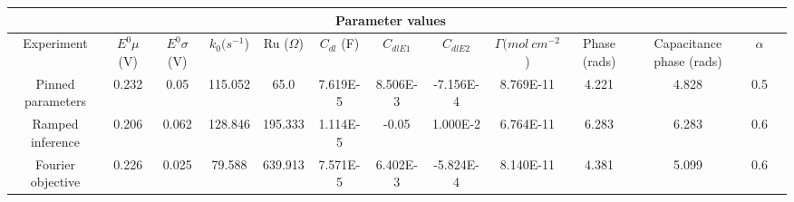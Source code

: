 \documentclass[preview]{standalone}
\begin{document}
\begin{center}
\begin{tabular}{|c|c|c|c|c|c|c|c|c|c|c|c|c|}
\hline
\multicolumn{12}{|c|}{Parameter values}\\ 
\hline
Experiment & $E^0 \mu$ (V) & $E^0 \sigma$ (V) & $k_0 (s^{-1}$) & Ru ($\Omega$) & $C_{dl}$ (F) & $C_{dlE1}$ & $C_{dlE2}$ & $\Gamma (mol\:cm^{-2}$) & Phase (rads) & Capacitance phase (rads) & $\alpha$\\
\hline
Pinned parameters & 0.232 & 0.05 & 115.052 & 65.0 & 7.619E-5 & 8.506E-3 & -7.156E-4 & 8.769E-11 & 4.221 & 4.828 & 0.5\\
\hline
Ramped inference & 0.206 & 0.062 & 128.846 & 195.333 & 1.114E-5 & -0.05 & 1.000E-2 & 6.764E-11 & 6.283 & 6.283 & 0.6\\
\hline
Fourier objective & 0.226 & 0.025 & 79.588 & 639.913 & 7.571E-5 & 6.402E-3 & -5.824E-4 & 8.140E-11 & 4.381 & 5.099 & 0.6\\
\hline
\end{tabular}
\end{center}
\end{document}
